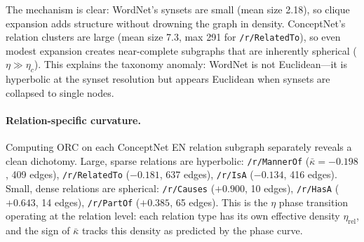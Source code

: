 \documentclass[11pt,a4paper]{article}
\newcommand{\kbar}{\bar{\kappa}}
\newcommand{\etac}{\eta_c}
\begin{document}
The mechanism is clear: WordNet's synsets are small (mean size 2.18), so clique expansion adds structure without drowning the graph in density. ConceptNet's relation clusters are large (mean size 7.3, max 291 for \texttt{/r/RelatedTo}), so even modest expansion creates near-complete subgraphs that are inherently spherical ($\eta \gg \etac$). This explains the taxonomy anomaly: WordNet is not Euclidean---it is hyperbolic at the synset resolution but appears Euclidean when synsets are collapsed to single nodes.

\paragraph{Relation-specific curvature.} Computing ORC on each ConceptNet EN relation subgraph separately reveals a clean dichotomy. Large, sparse relations are hyperbolic: \texttt{/r/MannerOf} ($\kbar = -0.198$, 409 edges), \texttt{/r/RelatedTo} ($-0.181$, 637 edges), \texttt{/r/IsA} ($-0.134$, 416 edges). Small, dense relations are spherical: \texttt{/r/Causes} ($+0.900$, 10 edges), \texttt{/r/HasA} ($+0.643$, 14 edges), \texttt{/r/PartOf} ($+0.385$, 65 edges). This is the $\eta$ phase transition operating at the relation level: each relation type has its own effective density $\eta_{\mathrm{rel}}$, and the sign of $\kbar$ tracks this density as predicted by the phase curve.
\end{document}
